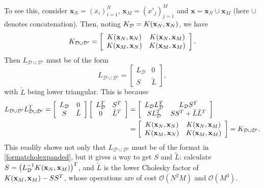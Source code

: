 To see this, consider $\mathbf{x}_N = (x_i)_{i=1}^N$, $\mathbf{x}_M = (x'_j)_{j=1}^M$ and $\mathbf{x} = \mathbf{x}_N \cup \mathbf{x}_M$ (here $\cup$ denotes concatenation). Then, noting $K_\mathcal{D} = K({\mathbf x}_N,{\mathbf x}_N)$, we have 
\begin{equation}
 K_{\mathcal{D}\cup\mathcal{D}'} = \left[ \begin{array}{cc}
K({\mathbf x}_N,{\mathbf x}_N) & K({\mathbf x}_N,{\mathbf x}_M) \\
K({\mathbf x}_M,{\mathbf x}_N) & K({\mathbf x}_M,{\mathbf x}_M) \end{array} \right].
\end{equation}
Then $L_{\mathcal{D}\cup\mathcal{D}'}$ must be of the form
\begin{equation}\label{formatcholexpanded}
L_{\mathcal{D}\cup\mathcal{D}'} = \left[ \begin{array}{cc}
L_\mathcal{D} & 0 \\
S & \tilde{L} \end{array} \right],
\end{equation}
with $\tilde{L}$ being lower triangular. This is because
\begin{equation}
\begin{split}
L_{\mathcal{D}\cup\mathcal{D}'} L_{\mathcal{D}\cup\mathcal{D}'}^T = \left[ \begin{array}{cc}
L_\mathcal{D} & 0 \\
S & \tilde{L} \end{array} \right] \left[ \begin{array}{cc}
L_\mathcal{D}^T & S^T \\
0 & \tilde{L}^T \end{array} \right] & = \left[ \begin{array}{cc}
L_\mathcal{D} L_\mathcal{D}^T & L_\mathcal{D} S^T \\
S L_\mathcal{D}^T & S S^T + \tilde{L} \tilde{L}^T \end{array} \right] \\
 & = \left[ \begin{array}{cc}
K({\mathbf x}_N,{\mathbf x}_N) & K({\mathbf x}_N,{\mathbf x}_M) \\
K({\mathbf x}_M,{\mathbf x}_N) & K({\mathbf x}_M,{\mathbf x}_M) \end{array} \right] = K_{\mathcal{D}\cup\mathcal{D}'}.
\end{split}
\end{equation}
This readily shows not only that $L_{\mathcal{D}\cup\mathcal{D}'}$ must be of the format in \eqref{formatcholexpanded}, but it gives a way to get $S$ and $\tilde{L}$: calculate $S= \big( L_\mathcal{D}^{-1} K({\mathbf x}_N,{\mathbf x}_M) \big)^T$, and $\tilde{L}$ is the lower Cholesky factor of $K({\mathbf x}_M,{\mathbf x}_M) - SS^T$, whose operations are of cost $\mathcal{O}(N^2 M)$ and $\mathcal{O}(M^3)$.